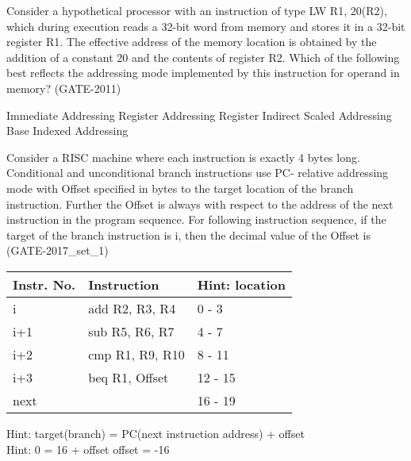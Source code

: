 \begin{questyle}
  \question  Consider a hypothetical processor with an instruction of type LW R1, 20(R2), which
             during execution reads a 32-bit word from memory and stores it in a 32-bit register R1.
             The effective address of the memory location is obtained by the addition of a
             constant 20 and the contents of register R2. Which of the following best reflects
             the addressing mode implemented by this instruction for operand in memory?  (GATE-2011)

  \begin{choices}
    \choice         Immediate Addressing
    \choice         Register Addressing
    \choice         Register Indirect Scaled Addressing
    \CorrectChoice  Base Indexed Addressing
  \end{choices}
\end{questyle}

\begin{questyle}
  \question  Consider a RISC machine where each instruction is exactly 4 bytes long. Conditional
             and unconditional branch instructions use PC- relative addressing mode with Offset
             specified in bytes to the target location of the branch instruction. Further the
             Offset is always with respect to the address of the next instruction in the program
             sequence. For following instruction sequence, if the target of the branch
             instruction is i, then the decimal value of the Offset is  \fillin[-16]  (GATE-2017\_set\_1)

             \begin{myTableStyle} \begin{tabular}{ |m{2cm}|m{3cm}|m{3cm}| } \hline
                Instr. No. & Instruction  & Hint: location\\ \hline
                i & add R2, R3, R4 & 0 - 3\\ \hline
                i+1 & sub R5, R6, R7 & 4 - 7\\ \hline
                i+2 & cmp R1, R9, R10 & 8 - 11\\ \hline
                i+3 & beq R1, Offset & 12 - 15\\ \hline
                next & & 16 - 19 \\ \hline
             \end{tabular} \end{myTableStyle} \vspace{0.08in}

             Hint: target(branch) = PC(next instruction address) + offset
             \\ Hint: 0 = 16 + offset \qquad offset = -16

\end{questyle}

